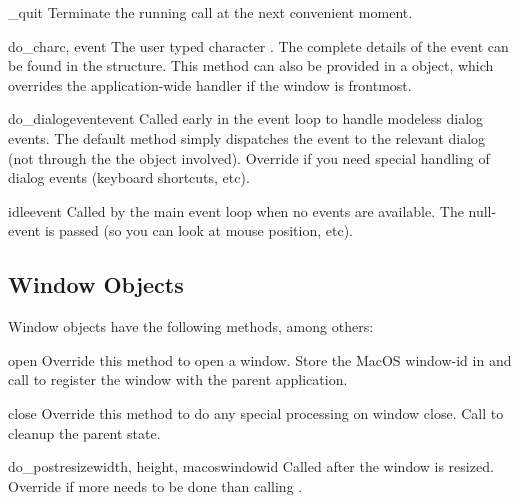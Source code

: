 \begin{funcdesc}{_quit}{}
Terminate the running  call at the next convenient
moment.
\end{funcdesc}

\begin{funcdesc}{do_char}{c, event}
The user typed character . The complete details of the event
can be found in the  structure. This method can also be
provided in a  object, which overrides the
application-wide handler if the window is frontmost.
\end{funcdesc}

\begin{funcdesc}{do_dialogevent}{event}
Called early in the event loop to handle modeless dialog events. The
default method simply dispatches the event to the relevant dialog (not
through the the  object involved). Override if you
need special handling of dialog events (keyboard shortcuts, etc).
\end{funcdesc}

\begin{funcdesc}{idle}{event}
Called by the main event loop when no events are available. The
null-event is passed (so you can look at mouse position, etc).
\end{funcdesc}

\subsection{Window Objects}
\label{window-objects}

Window objects have the following methods, among others:


\begin{funcdesc}{open}{}
Override this method to open a window. Store the MacOS window-id in
 and call  to register the
window with the parent application.
\end{funcdesc}

\begin{funcdesc}{close}{}
Override this method to do any special processing on window
close. Call  to cleanup the parent state.
\end{funcdesc}

\begin{funcdesc}{do_postresize}{width, height, macoswindowid}
Called after the window is resized. Override if more needs to be done
than calling .
\end{funcdesc}

